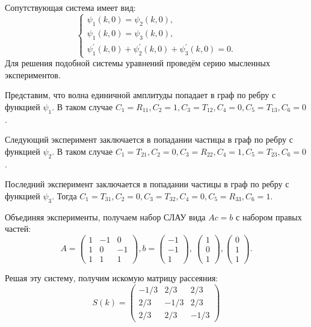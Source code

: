 \documentclass[a4 paper, 12 pt]{extarticle}
\begin{document}
  Сопутствующая система имеет вид:
  \[\begin{cases}
  \psi_{1}\left(k,0\right)=\psi_2\left(k,0\right), \\
  \psi_{1}\left(k,0\right)=\psi_3\left(k,0\right), \\
  \psi_1^\prime\left(k,0\right)+\psi_2^\prime\left(k,0\right)+\psi_3^\prime\left(k,0\right)=0.
  \end{cases}
  \]
  Для решения подобной системы уравнений проведём серию мысленных экспериментов.
  
  Представим, что волна единичной амплитуды попадает в граф по ребру с функцией $\psi_1$. В таком случае $C_1 = R_{11}, C_2 = 1, C_3 = T_{12}, C_4 = 0, C_5 = T_{13}, C_6 = 0$. 
  
  Следующий эксперимент заключается в попадании частицы в граф по ребру с функцией $\psi_2$. В таком случае $C_1 = T_{21}, C_2 = 0, C_3 = R_{22}, C_4 = 1, C_5 = T_{23}, C_6 = 0$.
  
  Последний эксперимент заключается в попадании частицы в граф по ребру с функцией $\psi_3$. Тогда $C_1 = T_{31}, C_2 = 0, C_3 = T_{32}, C_4 = 0, C_5 = R_{33}, C_6 = 1$.
  
  Объединяя эксперименты, получаем набор СЛАУ вида $Ac=b$ с набором правых частей:
   \[ A = \left(\begin{smallmatrix}
   1 & -1 & 0 \\
   1 & 0 & -1 \\
   1 & 1 & 1
   \end{smallmatrix}\right), b = \left(\begin{smallmatrix}
   -1 \\
   -1 \\
   1
   \end{smallmatrix}\right), \ 
   \left(\begin{smallmatrix}
   1 \\
   0 \\
   1
   \end{smallmatrix}\right),
   \left(\begin{smallmatrix}
   0 \\
   1 \\
   1
   \end{smallmatrix}\right).\]
   
   Решая эту систему, получим искомую матрицу рассеяния:
   \begin{equation}
   \label{starData}
   S(k)=
   \begin{pmatrix}
   -1/3 & 2/3 & 2/3 \\
   2/3 & -1/3 & 2/3 \\
   2/3 & 2/3 & -1/3 
   \end{pmatrix}
   \end{equation}
\end{document}
